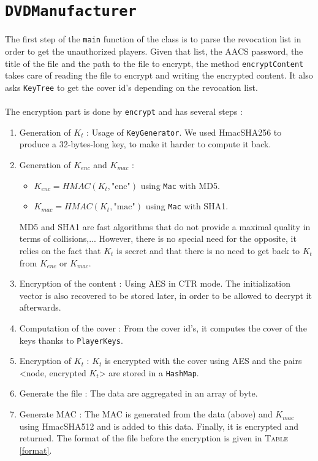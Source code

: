 \documentclass[a4paper,titlepage]{article}
\begin{document}
\section{\texttt{DVDManufacturer}}

The first step of the \texttt{main} function of the class is to parse the revocation list in order to get the unauthorized players. Given that list, the AACS password, the title of the file and the path to the file to encrypt, the method \texttt{encryptContent} takes care of reading the file to encrypt and writing the encrypted content. It also asks \texttt{KeyTree} to get the cover id's depending on the revocation list.
\paragraph{}
The encryption part is done by \texttt{encrypt} and has several steps : 
\begin{enumerate}
	\item Generation of $K_t$ : Usage of \texttt{KeyGenerator}. We used HmacSHA256 to produce a 32-bytes-long key, to make it harder to compute it back.
	
	\item Generation of $K_{enc}$ and $K_{mac}$ : 
	\begin{itemize}	
		\item $K_{enc} = HMAC(K_t, \text{"enc"})$ using \texttt{Mac} with MD5. 
		\item $K_{mac} = HMAC(K_t, \text{"mac"})$ using \texttt{Mac} with SHA1. 
	\end{itemize}
	MD5 and SHA1 are fast algorithms that do not provide a maximal quality in terms of collisions,... However, there is no special need for the opposite, it relies on the fact that $K_t$ is secret and that there is no need to get back to $K_t$ from $K_{enc}$ or $K_{mac}$.
	
	\item Encryption of the content : Using AES in CTR mode. The initialization vector is also recovered to be stored later, in order to be allowed to decrypt it afterwards. 
	
	\item Computation of the cover : From the cover id's, it computes the cover of the keys thanks to \texttt{PlayerKeys}.

	\item Encryption of $K_t$ : $K_t$ is encrypted with the cover using AES and the pairs <node, encrypted $K_t$> are stored in a \texttt{HashMap}.

	\item Generate the file : The data are aggregated in an array of byte.

	\item Generate MAC : The MAC is generated from the data (above) and $K_{mac}$ using HmacSHA512 and is added to this data. Finally, it is encrypted and returned. The format of the file before the encryption is given in \textsc{Table} \ref{format}.
\end{enumerate}
\end{document}
